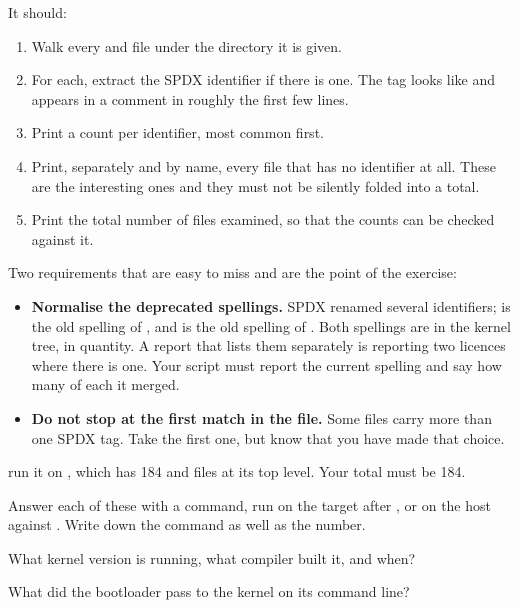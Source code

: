 It should:
\begin{enumerate}[label=\textbf{\alph*)}]
  \item Walk every  and  file under the directory it is given.
  \item For each, extract the SPDX identifier if there is one. The tag looks like
     and appears in a comment in roughly the first few
    lines.
  \item Print a count per identifier, most common first.
  \item Print, separately and by name, every file that has no identifier at all. These are the
    interesting ones and they must not be silently folded into a total.
  \item Print the total number of files examined, so that the counts can be checked against it.
\end{enumerate}
Two requirements that are easy to miss and are the point of the exercise:
\begin{itemize}
  \item \textbf{Normalise the deprecated spellings.} SPDX renamed several identifiers;
     is the old spelling of , and  is the old
    spelling of . Both spellings are in the kernel tree, in quantity. A
    report that lists them separately is reporting two licences where there is one. Your script must
    report the current spelling and say how many of each it merged.
  \item \textbf{Do not stop at the first match in the file.} Some files carry more than one SPDX
    tag. Take the first one, but know that you have made that choice.
\end{itemize}

\checkyourself run it on , which has 184  and
 files at its top level. Your total must be 184.

\label{c1:ex:7}

Answer each of these with a command, run on the target after , or on the host
against . Write down the command as well as the number.

 What kernel version is running, what compiler built it, and when?

 What did the bootloader pass to the kernel on its command line?


